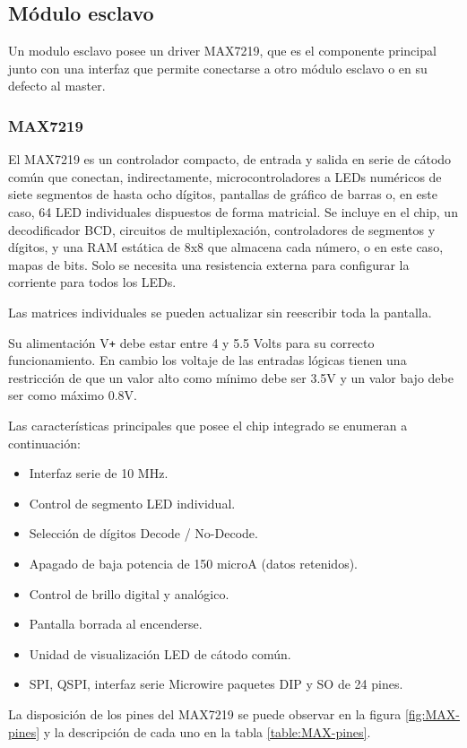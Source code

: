 \subsection{Módulo esclavo}
Un modulo esclavo posee un driver MAX7219, que es el componente principal junto con una interfaz que permite conectarse a otro módulo esclavo o en su defecto al master.

\subsubsection{MAX7219}\label{sec:max7219}
El MAX7219 es un controlador compacto, de entrada y salida en serie de cátodo común que conectan, indirectamente, microcontroladores a LEDs numéricos de siete segmentos de hasta ocho dígitos, pantallas de gráfico de barras o, en este caso, 64 LED individuales dispuestos de forma matricial. Se incluye en el chip, un decodificador BCD, circuitos de multiplexación, controladores de segmentos y dígitos, y una RAM estática de 8x8 que almacena cada número, o en este caso, mapas de bits. Solo se necesita una resistencia externa para configurar la corriente para todos los LEDs.

Las matrices individuales se pueden actualizar sin reescribir toda la pantalla.

Su alimentación V\texttt{+} debe estar entre 4 y 5.5 Volts para su correcto funcionamiento. En cambio los voltaje de las entradas lógicas tienen una restricción de que un valor alto como mínimo debe ser 3.5V y un valor bajo debe ser como máximo 0.8V.

Las características principales que posee el chip integrado se enumeran a continuación:
\begin{itemize}
	\item Interfaz serie de 10 MHz.
	\item Control de segmento LED individual.
	\item Selección de dígitos Decode / No-Decode.
	\item Apagado de baja potencia de 150 microA (datos retenidos).
	\item Control de brillo digital y analógico.
	\item Pantalla borrada al encenderse.
	\item Unidad de visualización LED de cátodo común.
	\item SPI, QSPI, interfaz serie Microwire paquetes DIP y SO de 24 pines.
\end{itemize}

La disposición de los pines del MAX7219 se puede observar en la figura \ref{fig:MAX-pines} y la descripción de cada uno en la tabla \ref{table:MAX-pines}.

